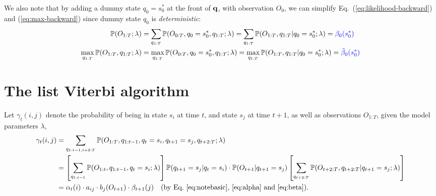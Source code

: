 We also note that by adding a dummy state $q_0 = s_0^*$ at the front of $\mathbf{q}$, with observation $O_0$, 
we can simplify Eq.~(\ref{eq:likelihood-backward}) and (\ref{eq:max-backward}) since dummy state $q_0$ is \emph{deterministic}:
\begin{align*}
\mathbb{P}(O_{1:T} ;\lambda) 
&= \sum_{q_{1:T}} \mathbb{P}(O_{0:T}, q_0 = s_0^*, q_{1:T}; \lambda)
 = \sum_{q_{1:T}} \mathbb{P}(O_{1:T}, q_{1:T} |q_0 = s_0^*; \lambda)
 = {\color{blue}{\beta_0(s_0^*)}} \\
\max_{q_{1:T}} \mathbb{P}(O_{1:T}, q_{1:T}; \lambda) 
&= \max_{q_{1:T}} \mathbb{P}(O_{0:T}, q_0 = s_0^*, q_{1:T}; \lambda)
 = \max_{q_{1:T}} \mathbb{P}(O_{1:T}, q_{1:T} |q_0 = s_0^*; \lambda)
 = {\color{blue}{\tilde{\beta}_0(s_0^*)}}
\end{align*}



\section{The list Viterbi algorithm}
\label{sec:lva}

Let $\gamma_t(i,j)$ denote the probability of being in state $s_i$ at time $t$, and state $s_j$ at time $t\!+\!1$, 
as well as observations $O_{1:T}$, given the model parameters $\lambda$, \ie
\begin{equation}
\label{eq:gamma}
\begin{aligned}
\gamma_t(i,j) 
&= \sum_{q_{1:t-1,t+2:T}} \mathbb{P}(O_{1:T}, q_{1:t-1}, q_t = s_i, q_{t+1} = s_j, q_{t+2:T} ;\lambda) \\
&= \left[ \sum_{q_{1:t-1}} \mathbb{P}(O_{1:t}, q_{1:t-1}, q_t = s_i ;\lambda) \right] \mathbb{P}(q_{t+1} = s_j |q_t = s_i) \cdot \mathbb{P}(O_{t+1} |q_{t+1} = s_j) 
   \left[ \sum_{q_{t+2:T}} \mathbb{P}(O_{t+2:T}, q_{t+2:T} |q_{t+1} = s_j; \lambda) \right] \\
&= \alpha_t(i) \cdot a_{ij} \cdot b_j(O_{t+1}) \cdot \beta_{t+1}(j) 
   ~~~ \text{(by Eq.~\ref{eq:notebasic}, \ref{eq:alpha} and \ref{eq:beta})}.
\end{aligned}
\end{equation}

